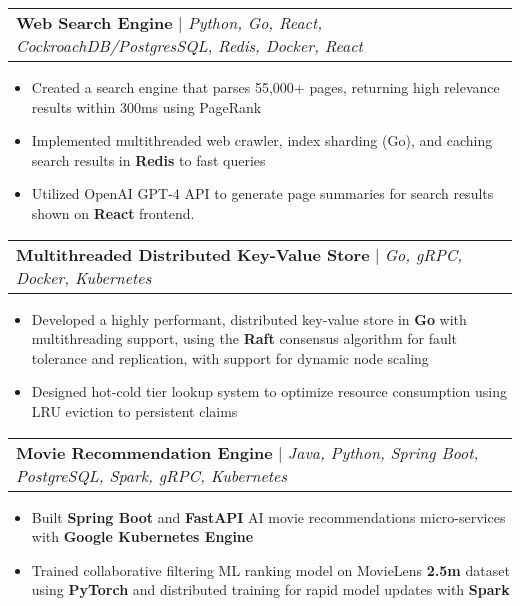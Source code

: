\documentclass[letterpaper,11pt]{article}
\makeatletter
\newcommand{\resumeItem}[1]{
  \item\small{
    {#1 \vspace{-2pt}}
  }
}
\newcommand{\resumeProjectHeading}[2]{
    \item
    \begin{tabular*}{0.97\textwidth}{l@{\extracolsep{\fill}}r}
      \small#1 & #2 \\
    \end{tabular*}\vspace{-7pt}
}
\newcommand{\resumeItemListStart}{\begin{itemize}}
\newcommand{\resumeItemListEnd}{\end{itemize}\vspace{-5pt}}
\makeatother
\begin{document}
        \resumeProjectHeading
          {\textbf{Web Search Engine} $|$ \emph{Python, Go, React, CockroachDB/PostgresSQL, Redis, Docker, React}}{}
          \resumeItemListStart
            \resumeItem{Created a search engine that parses 55,000+ pages, returning high relevance results within 300ms using PageRank}
            \resumeItem{Implemented multithreaded web crawler, index sharding (Go), and caching search results in \textbf{Redis} to fast queries}
            \resumeItem{Utilized OpenAI GPT-4 API to generate page summaries for search results shown on \textbf{React} frontend.}
          \resumeItemListEnd


        \resumeProjectHeading
          {\textbf{Multithreaded Distributed Key-Value Store} $|$ \emph{Go, gRPC, Docker, Kubernetes}}{}
          \resumeItemListStart
            \resumeItem{Developed a highly performant, distributed key-value store in \textbf{Go} with multithreading support, using the \textbf{Raft} consensus algorithm for fault tolerance and replication, with support for dynamic node scaling}
            \resumeItem{Designed hot-cold tier lookup system to optimize resource consumption using LRU eviction to persistent claims}
          \resumeItemListEnd

        \resumeProjectHeading
          {\textbf{Movie Recommendation Engine} $|$ \emph{Java, Python, Spring Boot, PostgreSQL, Spark, gRPC, Kubernetes}}{}
          \resumeItemListStart
          \resumeItem{Built \textbf{Spring Boot} and \textbf{FastAPI} AI movie recommendations micro-services with \textbf{Google Kubernetes Engine}}
          \resumeItem{Trained collaborative filtering ML ranking model on MovieLens \textbf{2.5m} dataset using \textbf{PyTorch} and distributed training for rapid model updates with \textbf{Spark}}
          \resumeItemListEnd
\end{document}
